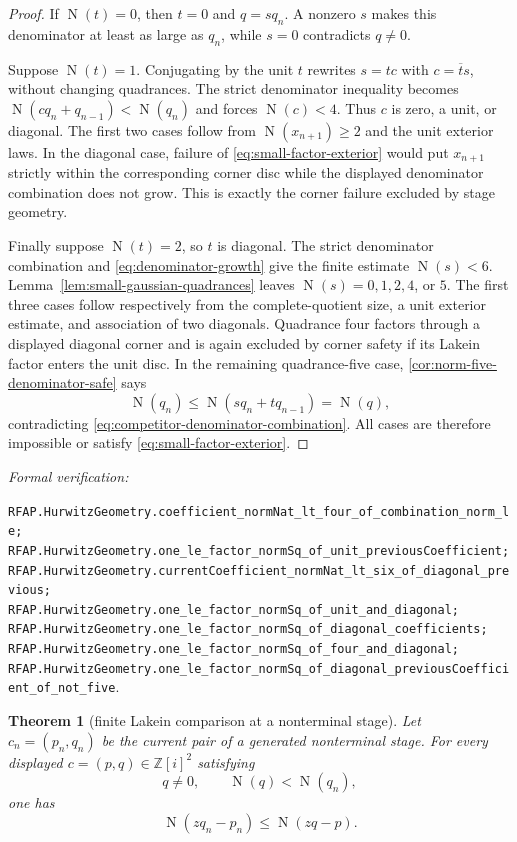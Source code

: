 \documentclass[11pt]{article}
\newtheorem{theorem}{Theorem}[section]
\newcommand{\Zi}{\mathbb{Z}[i]}
\newcommand{\Norm}[1]{\operatorname{N}\!\left(#1\right)}
\newcommand{\leanref}[1]{\par\smallskip\noindent
  \emph{Formal verification:}\par\nobreak
  {\raggedright\nolinkurl{#1}.\par}}
\begin{document}
\begin{proof}
If $\Norm t=0$, then $t=0$ and $q=sq_n$.  A nonzero $s$ makes this
denominator at least as large as $q_n$, while $s=0$ contradicts $q\ne0$.

Suppose $\Norm t=1$.  Conjugating by the unit $t$ rewrites
$s=t c$ with $c=\overline t s$, without changing quadrances.  The strict
denominator inequality becomes
$\Norm{cq_n+q_{n-1}}<\Norm{q_n}$ and forces $\Norm c<4$.  Thus $c$ is zero,
a unit, or diagonal.  The first two cases follow from
$\Norm{x_{n+1}}\ge2$ and the unit exterior laws.  In the diagonal case,
failure of \eqref{eq:small-factor-exterior} would put $x_{n+1}$ strictly
within the corresponding corner disc while the displayed denominator
combination does not grow.  This is exactly the corner failure excluded by
stage geometry.

Finally suppose $\Norm t=2$, so $t$ is diagonal.  The strict denominator
combination and \eqref{eq:denominator-growth} give the finite estimate
$\Norm s<6$.  Lemma~\ref{lem:small-gaussian-quadrances} leaves
$\Norm s=0,1,2,4$, or $5$.  The first three cases follow respectively from
the complete-quotient size, a unit exterior estimate, and association of two
diagonals.  Quadrance four factors through a displayed diagonal corner and
is again excluded by corner safety if its Lakein factor enters the unit
disc.  In the remaining quadrance-five case,
\cref{cor:norm-five-denominator-safe} says
\[
                 \Norm{q_n}\le\Norm{sq_n+tq_{n-1}}=\Norm q,
\]
contradicting \eqref{eq:competitor-denominator-combination}.  All cases are
therefore impossible or satisfy \eqref{eq:small-factor-exterior}.
\end{proof}

\leanref{RFAP.HurwitzGeometry.coefficient_normNat_lt_four_of_combination_norm_le;
RFAP.HurwitzGeometry.one_le_factor_normSq_of_unit_previousCoefficient;
RFAP.HurwitzGeometry.currentCoefficient_normNat_lt_six_of_diagonal_previous;
RFAP.HurwitzGeometry.one_le_factor_normSq_of_unit_and_diagonal;
RFAP.HurwitzGeometry.one_le_factor_normSq_of_diagonal_coefficients;
RFAP.HurwitzGeometry.one_le_factor_normSq_of_four_and_diagonal;
RFAP.HurwitzGeometry.one_le_factor_normSq_of_diagonal_previousCoefficient_of_not_five}

\begin{theorem}[finite Lakein comparison at a nonterminal stage]
\label{thm:finite-lakein-nonterminal}
Let $c_n=(p_n,q_n)$ be the current pair of a generated nonterminal stage.
For every displayed $c=(p,q)\in\Zi^2$ satisfying
\[
                         q\ne0,
             \qquad      \Norm q<\Norm{q_n},
\]
one has
\begin{equation}
\label{eq:finite-lakein-nonterminal}
                         \Norm{zq_n-p_n}\le\Norm{zq-p}.
\end{equation}
\end{theorem}
\end{document}

